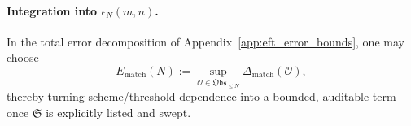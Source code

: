 \paragraph{Integration into $\epsilon_N(m,n)$.}
\InterfaceTag In the total error decomposition of Appendix~\ref{app:eft_error_bounds}, one may choose
\[
E_{\mathrm{match}}(N):=\sup_{\mathcal{O}\in\mathfrak{Obs}_{\le N}}\Delta_{\mathrm{match}}(\mathcal{O}),
\]
thereby turning scheme/threshold dependence into a bounded, auditable term once $\mathfrak{S}$ is explicitly listed and swept.

